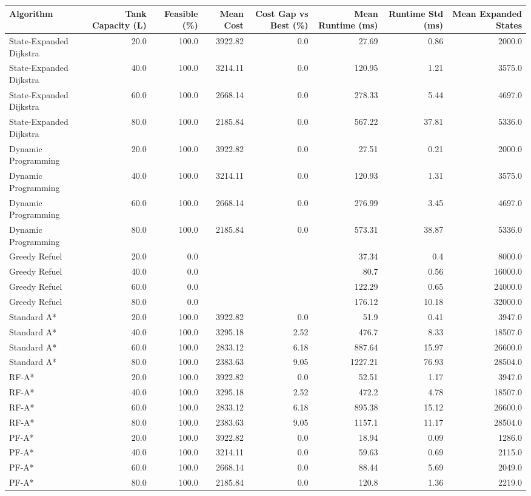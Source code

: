 \begin{tabular}{lrrrrrrr}
\hline
Algorithm & Tank Capacity (L) & Feasible (\%) & Mean Cost & Cost Gap vs Best (\%) & Mean Runtime (ms) & Runtime Std (ms) & Mean Expanded States \\
\hline
State-Expanded Dijkstra & 20.0 & 100.0 & 3922.82 & 0.0 & 27.69 & 0.86 & 2000.0 \\
State-Expanded Dijkstra & 40.0 & 100.0 & 3214.11 & 0.0 & 120.95 & 1.21 & 3575.0 \\
State-Expanded Dijkstra & 60.0 & 100.0 & 2668.14 & 0.0 & 278.33 & 5.44 & 4697.0 \\
State-Expanded Dijkstra & 80.0 & 100.0 & 2185.84 & 0.0 & 567.22 & 37.81 & 5336.0 \\
Dynamic Programming & 20.0 & 100.0 & 3922.82 & 0.0 & 27.51 & 0.21 & 2000.0 \\
Dynamic Programming & 40.0 & 100.0 & 3214.11 & 0.0 & 120.93 & 1.31 & 3575.0 \\
Dynamic Programming & 60.0 & 100.0 & 2668.14 & 0.0 & 276.99 & 3.45 & 4697.0 \\
Dynamic Programming & 80.0 & 100.0 & 2185.84 & 0.0 & 573.31 & 38.87 & 5336.0 \\
Greedy Refuel & 20.0 & 0.0 &  &  & 37.34 & 0.4 & 8000.0 \\
Greedy Refuel & 40.0 & 0.0 &  &  & 80.7 & 0.56 & 16000.0 \\
Greedy Refuel & 60.0 & 0.0 &  &  & 122.29 & 0.65 & 24000.0 \\
Greedy Refuel & 80.0 & 0.0 &  &  & 176.12 & 10.18 & 32000.0 \\
Standard A* & 20.0 & 100.0 & 3922.82 & 0.0 & 51.9 & 0.41 & 3947.0 \\
Standard A* & 40.0 & 100.0 & 3295.18 & 2.52 & 476.7 & 8.33 & 18507.0 \\
Standard A* & 60.0 & 100.0 & 2833.12 & 6.18 & 887.64 & 15.97 & 26600.0 \\
Standard A* & 80.0 & 100.0 & 2383.63 & 9.05 & 1227.21 & 76.93 & 28504.0 \\
RF-A* & 20.0 & 100.0 & 3922.82 & 0.0 & 52.51 & 1.17 & 3947.0 \\
RF-A* & 40.0 & 100.0 & 3295.18 & 2.52 & 472.2 & 4.78 & 18507.0 \\
RF-A* & 60.0 & 100.0 & 2833.12 & 6.18 & 895.38 & 15.12 & 26600.0 \\
RF-A* & 80.0 & 100.0 & 2383.63 & 9.05 & 1157.1 & 11.17 & 28504.0 \\
PF-A* & 20.0 & 100.0 & 3922.82 & 0.0 & 18.94 & 0.09 & 1286.0 \\
PF-A* & 40.0 & 100.0 & 3214.11 & 0.0 & 59.63 & 0.69 & 2115.0 \\
PF-A* & 60.0 & 100.0 & 2668.14 & 0.0 & 88.44 & 5.69 & 2049.0 \\
PF-A* & 80.0 & 100.0 & 2185.84 & 0.0 & 120.8 & 1.36 & 2219.0 \\
\hline
\end{tabular}
